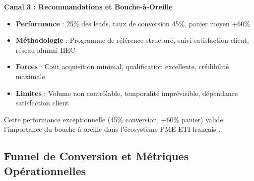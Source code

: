 \medskip
\textbf{Canal 3 : Recommandations et Bouche-à-Oreille}
\begin{itemize}
    \item \textbf{Performance} : 25\% des leads, taux de conversion 45\%, panier moyen +60\%
    \item \textbf{Méthodologie} : Programme de référence structuré, suivi satisfaction client, réseau alumni HEC
    \item \textbf{Forces} : Coût acquisition minimal, qualification excellente, crédibilité maximale
    \item \textbf{Limites} : Volume non contrôlable, temporalité imprévisible, dépendance satisfaction client
\end{itemize}
\medskip
Cette performance exceptionnelle (45\% conversion, +60\% panier) valide l'importance du bouche-à-oreille dans l'écosystème PME-ETI français \cite{meyer2014culture}.

\subsection{Funnel de Conversion et Métriques Opérationnelles}

